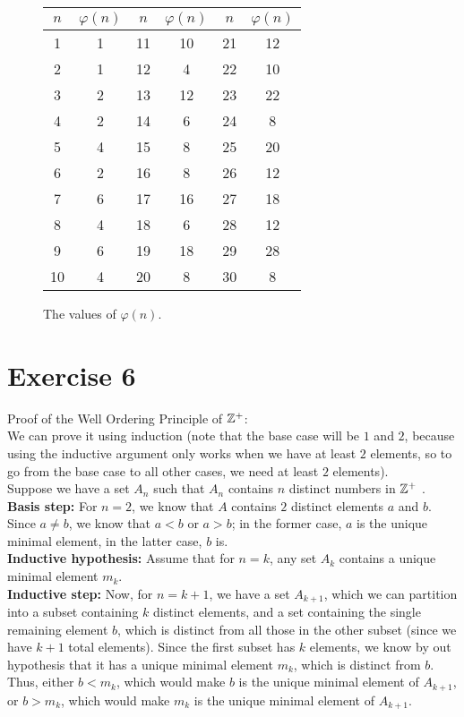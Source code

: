 \documentclass[12pt]{article}
\begin{document}
    \begin{figure}[H]
        \centering

        \begin{tabular}{|*{6}{c|}}
            \hline
            \( n \) & \( \varphi(n) \) & \( n \) & \( \varphi(n) \) 
            & \( n \) & \( \varphi(n) \) \\
            \hline
            1 & 1 & 11 & 10 & 21 & 12 \\
            2 & 1 & 12 & 4 & 22 & 10 \\
            3 & 2 & 13 & 12 & 23 & 22 \\
            4 & 2 & 14 & 6 & 24 & 8 \\
            5 & 4 & 15 & 8 & 25 & 20 \\
            6 & 2 & 16 & 8 & 26 & 12 \\
            7 & 6 & 17 & 16 & 27 & 18 \\
            8 & 4 & 18 & 6 & 28 & 12 \\
            9 & 6 & 19 & 18 & 29 & 28 \\
            10 & 4 & 20 & 8 & 30 & 8 \\
            \hline
        \end{tabular}
        \caption{\label{fig:figure1} The values of $\varphi(n)$.}
    \end{figure}
    
    \section*{Exercise 6}
    Proof of the Well Ordering Principle of $\mathbb{Z}^+$: \\
    We can prove it using induction
    (note that the base case will be $1$ and $2$,
    because using the inductive argument only works
    when we have at least $2$ elements,
    so to go from the base case to all other cases,
    we need at least $2$ elements). \\
    Suppose we have a set $A_n$
    such that $A_n$ contains $n$ distinct numbers in $\mathbb{Z}^+$ . \\
    \textbf{Basis step:}
    For $n = 2$,
    we know that $A$ contains $2$ distinct elements $a$ and $b$.
    Since $a \neq b$,
    we know that $a < b$ or $a > b$;
    in the former case, $a$ is the unique minimal element,
    in the latter case, $b$ is. \\
    \textbf{Inductive hypothesis:}
    Assume that for $n = k$,
    any set $A_k$ contains a unique minimal element $m_k$. \\
    \textbf{Inductive step:} 
    Now, for $n = k+1$,
    we have a set $A_{k+1}$,
    which we can partition into a subset containing
    $k$ distinct elements,
    and a set containing the single remaining element $b$,
    which is distinct from all those in the other subset
    (since we have $k+1$ total elements).
    Since the first subset has $k$ elements,
    we know by out hypothesis that it has
    a unique minimal element $m_k$,
    which is distinct from $b$.
    Thus, either $b < m_k$,
    which would make $b$ is the unique minimal element of $A_{k+1}$,
    or $b > m_k$,
    which would make $m_k$ is the unique minimal element of $A_{k+1}$. \\
\end{document}
